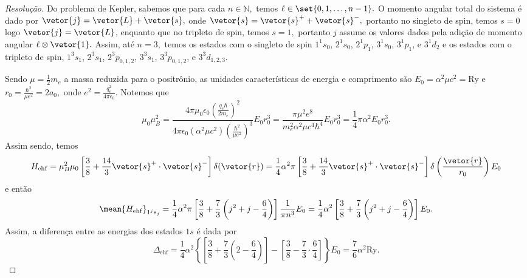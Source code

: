 \begin{proof}[Resolução]
   Do problema de Kepler, sabemos que para cada \(n \in \mathbb{N},\) temos \(\ell \in \set{0, 1, \dots, n -1}.\) O momento angular total do sistema é dado por \(\vetor{j} = \vetor{L} + \vetor{s},\) onde \(\vetor{s} = \vetor{s}^+ + \vetor{s}^-,\) portanto no singleto de spin, temos \(s = 0\) logo \(\vetor{j} = \vetor{L}\), enquanto que no tripleto de spin, temos \(s = 1,\) portanto \(j\) assume os valores dados pela adição de momento angular \(\ell \otimes \vetor{1}.\) Assim, até \(n = 3,\) temos os estados com o singleto de spin \(1^1s_0\), \(2^1s_0\), \(2^1p_1\), \(3^1s_0\), \(3^1p_1\), e \(3^1d_2\) e os estados com o tripleto de spin, \(1^3s_1\), \(2^3s_1\), \(2^3p_{0,1,2}\), \(3^3s_1\), \(3^3p_{0,1,2}\), e \(3^3d_{1,2,3}.\)

   Sendo \(\mu = \frac12 m_e\) a massa reduzida para o positrônio, as unidades características de energia e comprimento são \(E_0 = \alpha^2 \mu c^2 = \mathrm{Ry}\) e \(r_0 = \frac{\hbar^2}{\mu e^2} = 2 a_0,\) onde \(e^2 = \frac{q_e^2}{4\pi \epsilon_0}.\) Notemos que
   \begin{equation*}
      \mu_0 \mu_B^2 = \frac{4\pi \mu_0\epsilon_0\left(\frac{q_e \hbar}{2m_e }\right)^2}{4\pi \epsilon_0\left(\alpha^2 \mu c^2\right)\left(\frac{\hbar^2}{\mu e^2}\right)^3} E_0 r_0^3 = \frac{\pi \mu^2 e^8}{m_e^2 \alpha^2 \mu c^4 \hbar^4}E_0 r_0^3 = \frac14 \pi \alpha^2 E_0 r_0^3.
   \end{equation*}
   Assim sendo, temos
   \begin{equation*}
      H_{\mathrm{ehf}} = \mu_B^2 \mu_0\left[\frac38 + \frac{14}3\vetor{s}^+ \cdot \vetor{s}^-\right] \delta(\vetor{r}) = \frac14 \alpha^2 \pi \left[\frac38 + \frac{14}3\vetor{s}^+ \cdot \vetor{s}^-\right] \delta\left(\frac{\vetor{r}}{r_0}\right) E_0
   \end{equation*}
   e então
   \begin{equation*}
      \mean{H_{\mathrm{ehf}}}_{1^js_j} = \frac14 \alpha^2 \pi \left[\frac38 + \frac73 \left(j^2+j - \frac64\right)\right] \frac{1}{\pi n^3}E_0 = \frac14 \alpha^2 \left[\frac38 + \frac73 \left(j^2 + j - \frac64\right)\right]E_0.
   \end{equation*}
   Assim, a diferença entre as energias dos estados \(1s\) é dada por
   \begin{equation*}
      \Delta_\mathrm{ehf} = \frac{1}{4}\alpha^2\left\{\left[\frac38 + \frac73\left(2 - \frac64\right)\right] - \left[\frac38 - \frac73\cdot \frac64\right]\right\}E_0 = \frac7{6} \alpha^2 \mathrm{Ry}.
   \end{equation*}


\end{proof}
